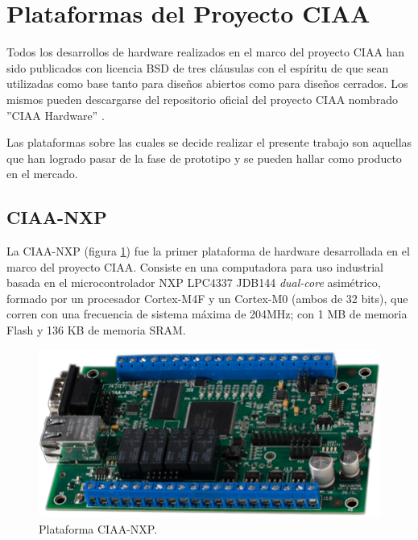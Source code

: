 \section{Plataformas del Proyecto CIAA}
\label{sec:ciaaBoards}

Todos los desarrollos de hardware realizados en el marco del proyecto CIAA han sido publicados con licencia BSD de tres cláusulas con el espíritu de que sean utilizadas como base tanto para diseños abiertos como para diseños cerrados. Los mismos pueden descargarse del repositorio oficial del proyecto CIAA nombrado ''CIAA Hardware'' \citep{ciaaHW}.

Las plataformas sobre las cuales se decide realizar el presente trabajo son aquellas que han logrado pasar de la fase de prototipo y se pueden hallar como producto en el mercado.

\subsection{CIAA-NXP}
\label{sec:CIAA-NXP}

La CIAA-NXP (figura \ref{fig:ciaaNxp}) fue la primer plataforma de hardware desarrollada en el marco del proyecto CIAA. Consiste en una computadora para uso industrial basada en el microcontrolador NXP LPC4337 JDB144 \citep{LPC4337} \emph{dual-core} asimétrico, formado por un procesador Cortex-M4F y un Cortex-M0 (ambos de 32 bits), que corren con una frecuencia de sistema máxima de 204MHz; con 1 MB de memoria Flash y 136 KB de memoria SRAM.


\begin{figure}[!htbp]
\begin{center}  %
\includegraphics*[width=\textwidth]{Figures/CIAA-NXP_Foto.png}
\par\caption{Plataforma CIAA-NXP.}\label{fig:ciaaNxp}
\end{center}
\end{figure}

